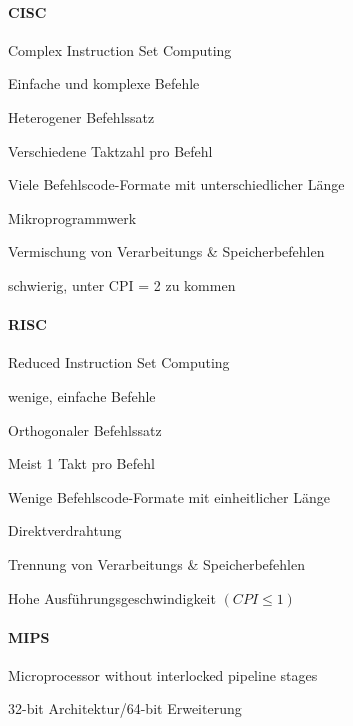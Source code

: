 \documentclass[10pt,landscape]{article}
\begin{document}
\raggedright
\footnotesize
\begin{multicols}{3}
  
  \setlength{\columnseprule}{0.25pt}
  \setlength{\premulticols}{1pt}
  \setlength{\postmulticols}{1pt}
  \setlength{\multicolsep}{1pt}
  \setlength{\columnsep}{2pt}

  \paragraph{CISC}
  \begin{itemize*}
    \item Complex Instruction Set Computing
    \item Einfache und komplexe Befehle
    \item Heterogener Befehlssatz
    \item Verschiedene Taktzahl pro Befehl
    \item Viele Befehlscode-Formate mit unterschiedlicher Länge
    \item Mikroprogrammwerk                             
    \item Vermischung von Verarbeitungs \& Speicherbefehlen
    \item schwierig, unter CPI = 2 zu kommen
  \end{itemize*}
  
  \paragraph{RISC}
  \begin{itemize*}
    \item Reduced Instruction Set Computing
    \item wenige, einfache Befehle
    \item Orthogonaler Befehlssatz   
    \item Meist 1 Takt pro Befehl
    \item Wenige Befehlscode-Formate mit einheitlicher Länge 
    \item Direktverdrahtung
    \item Trennung von Verarbeitungs \& Speicherbefehlen  
    \item Hohe Ausführungsgeschwindigkeit $(CPI \leq 1)$
  \end{itemize*}
  
  \paragraph{MIPS}
  \begin{itemize*}
    \item Microprocessor without interlocked pipeline stages
    \item 32-bit Architektur/64-bit Erweiterung
  \end{itemize*}
  

\end{multicols}
\end{document}
